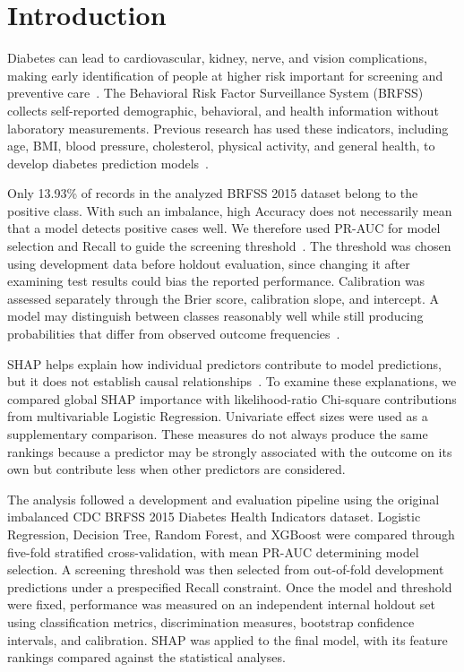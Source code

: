 \documentclass[pdflatex,sn-basic,Numbered]{sn-jnl}
\begin{document}
\maketitle


\section{Introduction}
\label{sec:intro}

Diabetes can lead to cardiovascular, kidney, nerve, and vision complications, making early identification of people at higher risk important for screening and preventive care~\citep{ullah2022detecting,olisah2022diabetes,zhang2024prediabetes}.
The Behavioral Risk Factor Surveillance System (BRFSS) collects self-reported demographic, behavioral, and health information without laboratory measurements. Previous research has used these indicators, including age, BMI, blood pressure, cholesterol, physical activity, and general health, to develop diabetes prediction models~\citep{xie2019diabetes,li2024gaxgboost,muhammad2025brfss}.

Only 13.93\% of records in the analyzed BRFSS 2015 dataset belong to the positive class. With such an imbalance, high Accuracy does not necessarily mean that a model detects positive cases well. We therefore used PR-AUC for model selection and Recall to guide the screening threshold~\citep{saito2015precisionrecall}. The threshold was chosen using development data before holdout evaluation, since changing it after examining test results could bias the reported performance. Calibration was assessed separately through the Brier score, calibration slope, and intercept. A model may distinguish between classes reasonably well while still producing probabilities that differ from observed outcome frequencies~\citep{huang2020calibration}.

SHAP helps explain how individual predictors contribute to model predictions, but it does not establish causal relationships~\citep{lundberg2017unified,lundberg2020trees}. To examine these explanations, we compared global SHAP importance with likelihood-ratio Chi-square contributions from multivariable Logistic Regression. Univariate effect sizes were used as a supplementary comparison. These measures do not always produce the same rankings because a predictor may be strongly associated with the outcome on its own but contribute less when other predictors are considered.

The analysis followed a development and evaluation pipeline using the original imbalanced CDC BRFSS 2015 Diabetes Health Indicators dataset. Logistic Regression, Decision Tree, Random Forest, and XGBoost were compared through five-fold stratified cross-validation, with mean PR-AUC determining model selection. A screening threshold was then selected from out-of-fold development predictions under a prespecified Recall constraint. Once the model and threshold were fixed, performance was measured on an independent internal holdout set using classification metrics, discrimination measures, bootstrap confidence intervals, and calibration. SHAP was applied to the final model, with its feature rankings compared against the statistical analyses.
\end{document}

